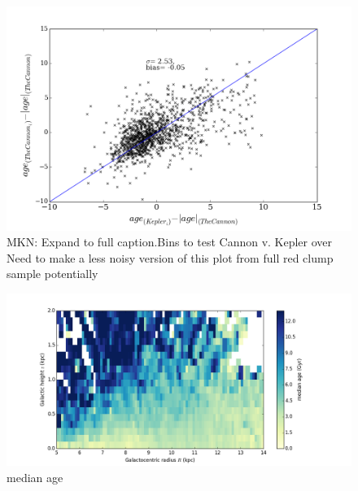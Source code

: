 \documentclass[12pt, preprint]{aastex}
\begin{document}
\begin{figure}[p!]
\centering
    \includegraphics[scale=0.31]{./plots/delta_age_2.png}
    \caption{MKN: Expand to full caption.Bins to test Cannon v. Kepler over  Need to make a less noisy version of this plot from full red clump sample potentially  }
\label{fig:alphabins}
\end{figure}

\begin{figure}[p!]
\centering
    \includegraphics[scale=0.4]{./plots/median_age_abs.png}
    \caption{median age  }
\label{fig:alphabins}
\vspace{-60pt}
\end{figure}
\end{document}
